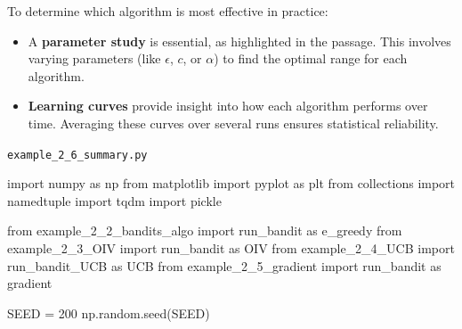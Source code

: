\documentclass[
  letterpaper,
]{krantz}
\makeatletter
\newenvironment{Shaded}{\begin{snugshade}}{\end{snugshade}}
\newcommand{\DecValTok}[1]{\textcolor[rgb]{0.68,0.00,0.00}{#1}}
\newcommand{\ImportTok}[1]{\textcolor[rgb]{0.00,0.46,0.62}{#1}}
\newcommand{\NormalTok}[1]{\textcolor[rgb]{0.00,0.23,0.31}{#1}}
\newcommand{\OperatorTok}[1]{\textcolor[rgb]{0.37,0.37,0.37}{#1}}
\providecommand{\tightlist}{%
  \setlength{\itemsep}{0pt}\setlength{\parskip}{0pt}}\usepackage{longtable,booktabs,array}
\newenvironment{kframe}{%
\medskip{}
\setlength{\fboxsep}{.8em}
 \def\at@end@of@kframe{}%
 \ifinner\ifhmode%
  \def\at@end@of@kframe{\end{minipage}}%
  \begin{minipage}{\columnwidth}%
 \fi\fi%
 \def\FrameCommand##1{\hskip\@totalleftmargin \hskip-\fboxsep
 \colorbox{shadecolor}{##1}\hskip-\fboxsep
     \hskip-\linewidth \hskip-\@totalleftmargin \hskip\columnwidth}%
 \MakeFramed {\advance\hsize-\width
   \@totalleftmargin\z@ \linewidth\hsize
   \@setminipage}}%
 {\par\unskip\endMakeFramed%
 \at@end@of@kframe}
\renewenvironment{Shaded}{\begin{kframe}}{\end{kframe}}
\theoremstyle{plain}
\theoremstyle{definition}
\theoremstyle{definition}
\theoremstyle{remark}
\makeatother
\begin{document}
To determine which algorithm is most effective in practice:

\begin{itemize}
\tightlist
\item
  A \textbf{parameter study} is essential, as highlighted in the
  passage. This involves varying parameters (like \(\epsilon\), \(c\),
  or \(\alpha\)) to find the optimal range for each algorithm.
\item
  \textbf{Learning curves} provide insight into how each algorithm
  performs over time. Averaging these curves over several runs ensures
  statistical reliability.
\end{itemize}

\begin{codelisting}

\caption{\texttt{example\_2\_6\_summary.py}}

\begin{Shaded}
\begin{Highlighting}[]
\ImportTok{import}\NormalTok{ numpy }\ImportTok{as}\NormalTok{ np}
\ImportTok{from}\NormalTok{ matplotlib }\ImportTok{import}\NormalTok{ pyplot }\ImportTok{as}\NormalTok{ plt}
\ImportTok{from}\NormalTok{ collections }\ImportTok{import}\NormalTok{ namedtuple}
\ImportTok{import}\NormalTok{ tqdm}
\ImportTok{import}\NormalTok{ pickle}

\ImportTok{from}\NormalTok{ example\_2\_2\_bandits\_algo }\ImportTok{import}\NormalTok{ run\_bandit }\ImportTok{as}\NormalTok{ e\_greedy}
\ImportTok{from}\NormalTok{ example\_2\_3\_OIV }\ImportTok{import}\NormalTok{ run\_bandit }\ImportTok{as}\NormalTok{ OIV}
\ImportTok{from}\NormalTok{ example\_2\_4\_UCB }\ImportTok{import}\NormalTok{ run\_bandit\_UCB }\ImportTok{as}\NormalTok{ UCB}
\ImportTok{from}\NormalTok{ example\_2\_5\_gradient }\ImportTok{import}\NormalTok{ run\_bandit }\ImportTok{as}\NormalTok{ gradient}

\NormalTok{SEED }\OperatorTok{=} \DecValTok{200}
\NormalTok{np.random.seed(SEED)}



\end{Highlighting}
\end{Shaded}
\end{codelisting}
\end{document}
